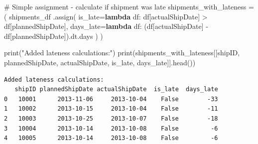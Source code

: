 \documentclass[
  letterpaper,
  DIV=11,
  numbers=noendperiod]{scrartcl}
\newenvironment{Shaded}{\begin{snugshade}}{\end{snugshade}}
\newcommand{\BuiltInTok}[1]{\textcolor[rgb]{0.00,0.23,0.31}{#1}}
\newcommand{\CommentTok}[1]{\textcolor[rgb]{0.37,0.37,0.37}{#1}}
\newcommand{\KeywordTok}[1]{\textcolor[rgb]{0.00,0.23,0.31}{\textbf{#1}}}
\newcommand{\NormalTok}[1]{\textcolor[rgb]{0.00,0.23,0.31}{#1}}
\newcommand{\OperatorTok}[1]{\textcolor[rgb]{0.37,0.37,0.37}{#1}}
\newcommand{\StringTok}[1]{\textcolor[rgb]{0.13,0.47,0.30}{#1}}
\begin{document}
\label{mental-model-1-assign}
\begin{Shaded}
\begin{Highlighting}[]
\CommentTok{\# Simple assignment {-} calculate if shipment was late}
\NormalTok{shipments\_with\_lateness }\OperatorTok{=}\NormalTok{ (}
\NormalTok{    shipments\_df}
\NormalTok{    .assign(}
\NormalTok{        is\_late}\OperatorTok{=}\KeywordTok{lambda}\NormalTok{ df: df[}\StringTok{\textquotesingle{}actualShipDate\textquotesingle{}}\NormalTok{] }\OperatorTok{\textgreater{}}\NormalTok{ df[}\StringTok{\textquotesingle{}plannedShipDate\textquotesingle{}}\NormalTok{],}
\NormalTok{        days\_late}\OperatorTok{=}\KeywordTok{lambda}\NormalTok{ df: (df[}\StringTok{\textquotesingle{}actualShipDate\textquotesingle{}}\NormalTok{] }\OperatorTok{{-}}\NormalTok{ df[}\StringTok{\textquotesingle{}plannedShipDate\textquotesingle{}}\NormalTok{]).dt.days}
\NormalTok{    )}
\NormalTok{)}

\BuiltInTok{print}\NormalTok{(}\StringTok{"Added lateness calculations:"}\NormalTok{)}
\BuiltInTok{print}\NormalTok{(shipments\_with\_lateness[[}\StringTok{\textquotesingle{}shipID\textquotesingle{}}\NormalTok{, }\StringTok{\textquotesingle{}plannedShipDate\textquotesingle{}}\NormalTok{, }\StringTok{\textquotesingle{}actualShipDate\textquotesingle{}}\NormalTok{, }\StringTok{\textquotesingle{}is\_late\textquotesingle{}}\NormalTok{, }\StringTok{\textquotesingle{}days\_late\textquotesingle{}}\NormalTok{]].head())}
\end{Highlighting}
\end{Shaded}

\begin{verbatim}
Added lateness calculations:
   shipID plannedShipDate actualShipDate  is_late  days_late
0   10001      2013-11-06     2013-10-04    False        -33
1   10002      2013-10-15     2013-10-04    False        -11
2   10003      2013-10-25     2013-10-07    False        -18
3   10004      2013-10-14     2013-10-08    False         -6
4   10005      2013-10-14     2013-10-08    False         -6
\end{verbatim}
\end{document}

